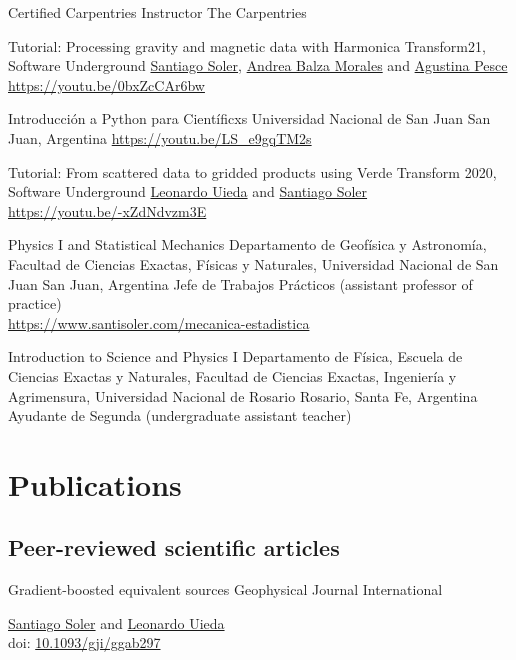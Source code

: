 \documentclass[a4paper,12pt,sans,colorlinks]{moderncv/moderncv}
\newcommand{\me}{\href{https://www.santisoler.com}{Santiago Soler}}
\newcommand{\agustina}{\href{https://aguspesce.github.io}{Agustina Pesce}}
\newcommand{\andrea}{\href{https://www.andreabalza.com/}{Andrea Balza Morales}}
\newcommand{\leo}{\href{https://www.leouieda.com}{Leonardo Uieda}}
\newcommand{\doi}[1]{
    \href{https://doi.org/#1}{#1}
}
\begin{document}
{Certified Carpentries Instructor} %
{The Carpentries} %
{} %
{} %
{} %

{Tutorial: Processing gravity and magnetic data with Harmonica}
{Transform21, Software Underground}
{}
{}
{
    \me{}, \andrea{} and \agustina{}
    \\
    \url{https://youtu.be/0bxZcCAr6bw}
}

{Introducción a Python para Científicxs} %
{Universidad Nacional de San Juan} %
{San Juan, Argentina} %
{} %
{\url{https://youtu.be/LS_e9gqTM2s}}

{Tutorial: From scattered data to gridded products using Verde}
{Transform 2020, Software Underground}
{}
{}
{
    \leo{} and \me{}
    \\
    \url{https://youtu.be/-xZdNdvzm3E}
}

{Physics I and Statistical Mechanics}
{
    Departamento de Geofísica y Astronomía,
    Facultad de Ciencias Exactas, Físicas y Naturales,
    Universidad Nacional de San Juan
}
{San Juan, Argentina}
{}
{
    Jefe de Trabajos Prácticos (assistant professor of practice)
    \\
    \url{https://www.santisoler.com/mecanica-estadistica}
}

{Introduction to Science and Physics I}
{
    Departamento de Física,
    Escuela de Ciencias Exactas y Naturales,
    Facultad de Ciencias Exactas, Ingeniería y Agrimensura,
    Universidad Nacional de Rosario
}
{Rosario, Santa Fe, Argentina}
{}
{Ayudante de Segunda (undergraduate assistant teacher)}


\section{Publications}

\subsection{Peer-reviewed scientific articles}

{Gradient-boosted equivalent sources}
{Geophysical Journal International}
{}
{}
{
    \me{} and \leo{}
    \\
    doi: \doi{10.1093/gji/ggab297}
}
\end{document}
